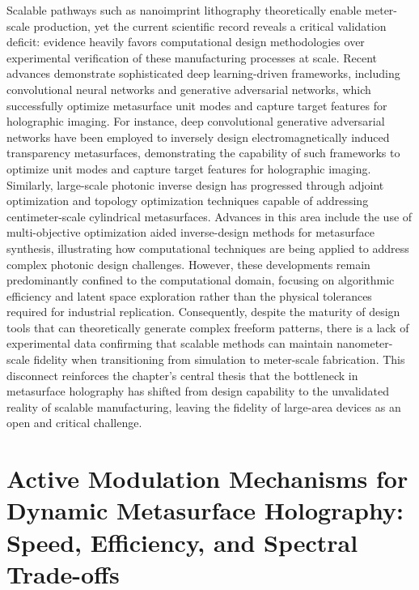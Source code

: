 \documentclass[11pt]{article}
\begin{document}
Scalable pathways such as nanoimprint lithography theoretically enable meter-scale production, yet the current scientific record reveals a critical validation deficit: evidence heavily favors computational design methodologies over experimental verification of these manufacturing processes at scale. Recent advances demonstrate sophisticated deep learning-driven frameworks, including convolutional neural networks and generative adversarial networks, which successfully optimize metasurface unit modes and capture target features for holographic imaging. For instance, deep convolutional generative adversarial networks have been employed to inversely design electromagnetically induced transparency metasurfaces, demonstrating the capability of such frameworks to optimize unit modes and capture target features for holographic imaging. \citep{doi_10_1088_1402_4896_acf007_ad71688e} Similarly, large-scale photonic inverse design has progressed through adjoint optimization and topology optimization techniques capable of addressing centimeter-scale cylindrical metasurfaces. Advances in this area include the use of multi-objective optimization aided inverse-design methods for metasurface synthesis, illustrating how computational techniques are being applied to address complex photonic design challenges. \citep{doi_10_1117_12_2529823_81c5e659} However, these developments remain predominantly confined to the computational domain, focusing on algorithmic efficiency and latent space exploration rather than the physical tolerances required for industrial replication. Consequently, despite the maturity of design tools that can theoretically generate complex freeform patterns, there is a lack of experimental data confirming that scalable methods can maintain nanometer-scale fidelity when transitioning from simulation to meter-scale fabrication. This disconnect reinforces the chapter's central thesis that the bottleneck in metasurface holography has shifted from design capability to the unvalidated reality of scalable manufacturing, leaving the fidelity of large-area devices as an open and critical challenge. \citep{doi_10_3390_photonics12100947_b44bdefd} \citep{doi_10_1515_nanoph_2024_0127_c4fd5a12}

\section{Active Modulation Mechanisms for Dynamic Metasurface Holography: Speed, Efficiency, and Spectral Trade-offs}\label{active-modulation-mechanisms-for-dynamic-metasurface-holography-speed-efficiency-and-spectral-trade-offs}
\end{document}
